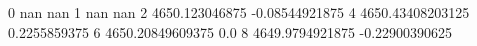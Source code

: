 0 nan nan
1 nan nan
2 4650.123046875 -0.08544921875
4 4650.43408203125 0.2255859375
6 4650.20849609375 0.0
8 4649.9794921875 -0.22900390625
